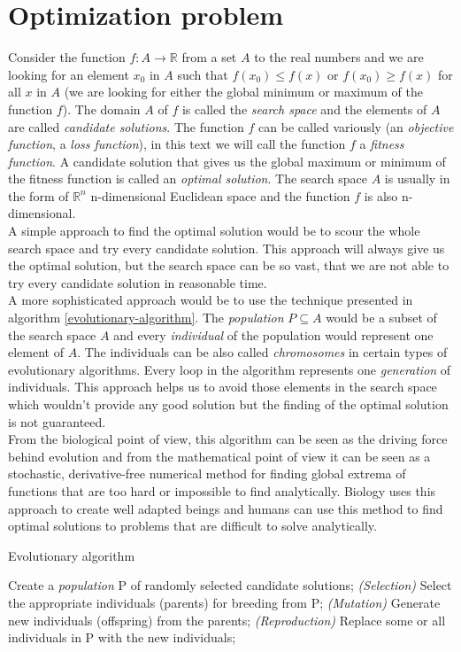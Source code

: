\section{Optimization problem}
Consider the function $f: A \to \mathbb{R}$ from a set $A$ to the real numbers and we are looking for an element $x_0$ in $A$ such that $f(x_0) \leq f(x)$ or $f(x_0) \geq f(x)$ for all $x$ in $A$ (we are looking for either the global minimum or maximum of the function $f$). The domain $A$ of $f$ is called the \textit{search space} and the elements of $A$ are called \textit{candidate solutions}. The function $f$ can be called variously (an \textit{objective function}, a \textit{loss function}), in this text we will call the function $f$ a \textit{fitness function}. A candidate solution that gives us the global maximum or minimum of the fitness function is called an \textit{optimal solution}. The search space $A$ is usually in the form of $\mathbb{R}^n$ n-dimensional Euclidean space and the function $f$ is also n-dimensional.\\
A simple approach to find the optimal solution would be to scour the whole search space and try every candidate solution. This approach will always give us the optimal solution, but the search space can be so vast, that we are not able to try every candidate solution in reasonable time.\\
A more sophisticated approach would be to use the technique presented in algorithm \ref{evolutionary-algorithm}. The \textit{population} $P \subseteq A$ would be a subset of the search space $A$ and every \textit{individual} of the population would represent one element of $A$. The individuals can be also called \textit{chromosomes} in certain types of evolutionary algorithms. Every loop in the algorithm represents one \textit{generation} of individuals. This approach helps us to avoid those elements in the search space which wouldn't provide any good solution but the finding of the optimal solution is not guaranteed.\\
From the biological point of view, this algorithm can be seen as the driving force behind evolution and from the mathematical point of view it can be seen as a stochastic, derivative-free numerical method for finding global extrema of functions that are too hard or impossible to find analytically.
Biology uses this approach to create well adapted beings and humans can use this method to find optimal solutions to problems that are difficult to solve analytically.

\begin{algorithm}
	\caption{Evolutionary algorithm}\label{evolutionary-algorithm}
	\begin{algorithmic}[1]
		\State Create a \textit{population} P of randomly selected candidate solutions;
		    \State \textit{(Selection)} Select the appropriate individuals (parents) for breeding from P;
		    \State \textit{(Mutation)} Generate new individuals (offspring) from the parents;
		    \State \textit{(Reproduction)} Replace some or all individuals in P with the new individuals;
		\EndWhile
	\end{algorithmic}
\end{algorithm}

